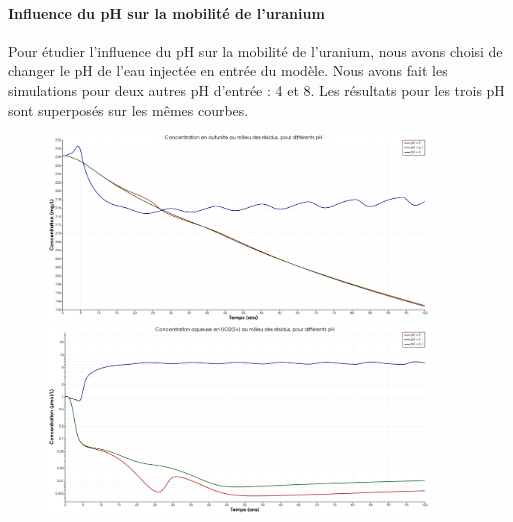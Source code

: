 \documentclass{article}
\begin{document}
\paragraph{Influence du pH sur la mobilité de l'uranium}

Pour étudier l’influence du pH sur la mobilité de l’uranium, nous avons choisi de changer le pH de l’eau injectée en entrée du modèle. Nous avons fait les simulations pour deux autres pH d’entrée : 4 et 8. Les résultats pour les trois pH sont superposés sur les mêmes courbes.

\begin{figure}[H]
    \centering
    \begin{minipage}{0.5\textwidth}
        \centering
        \includegraphics[width=0.9\textwidth]{III_B_2_9.png} 
        \caption{}
        \label{fig:autunite_residus_comparaison}
    \end{minipage}\hfill
    \begin{minipage}{0.5\textwidth}
        \centering
        \includegraphics[width=0.9\textwidth]{III_B_2_10.png} 
        \caption{}
        \label{fig:UO2_residus_comparaison}
    \end{minipage}
\end{figure}
\end{document}
